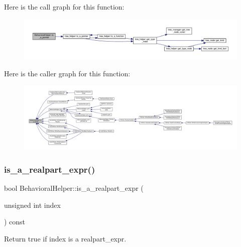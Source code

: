 Here is the call graph for this function\+:
\nopagebreak
\begin{figure}[H]
\begin{center}
\leavevmode
\includegraphics[width=350pt]{dd/db2/classBehavioralHelper_a1c00023a8c27e720ca4b125e6980d595_cgraph}
\end{center}
\end{figure}
Here is the caller graph for this function\+:
\nopagebreak
\begin{figure}[H]
\begin{center}
\leavevmode
\includegraphics[width=350pt]{dd/db2/classBehavioralHelper_a1c00023a8c27e720ca4b125e6980d595_icgraph}
\end{center}
\end{figure}
\mbox{\label{classBehavioralHelper_adeb3d0584527e099e99da968a854b2d3}} 
\subsubsection{\texorpdfstring{is\+\_\+a\+\_\+realpart\+\_\+expr()}{is\_a\_realpart\_expr()}}
{\footnotesize\ttfamily bool Behavioral\+Helper\+::is\+\_\+a\+\_\+realpart\+\_\+expr (\begin{DoxyParamCaption}\item[{unsigned int}]{index }\end{DoxyParamCaption}) const\hspace{0.3cm}{\ttfamily [virtual]}}



Return true if index is a realpart\+\_\+expr. 


